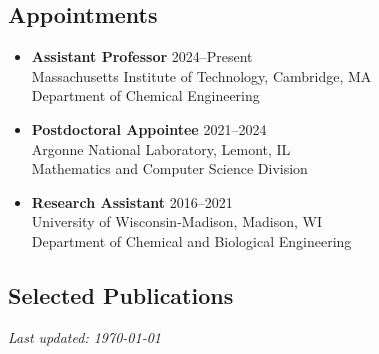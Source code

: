 \documentclass[letterpaper, 11pt]{article}
\begin{document}
\thispagestyle{empty}


% 
% 
\subsection*{Appointments}
\begin{itemize}[itemsep=1pt, parsep=0pt,leftmargin=*]
\item[] {\bf Assistant Professor} \hfill 2024--Present\\
Massachusetts Institute of Technology, Cambridge, MA\\
Department of Chemical Engineering
\item[] {\bf Postdoctoral Appointee} \hfill 2021--2024\\
  Argonne National Laboratory, Lemont, IL\\
  Mathematics and Computer Science Division 
\item[] {\bf Research Assistant} \hfill 2016--2021\\
  University of Wisconsin-Madison, Madison, WI\\
  Department of Chemical and Biological Engineering 
\end{itemize}



%  
% 
% 

\subsection*{Selected Publications}
\renewcommand*{\labelenumi}{[S\theenumi]}


% 
%  

{\noindent\it Last updated: \today}
\end{document}
